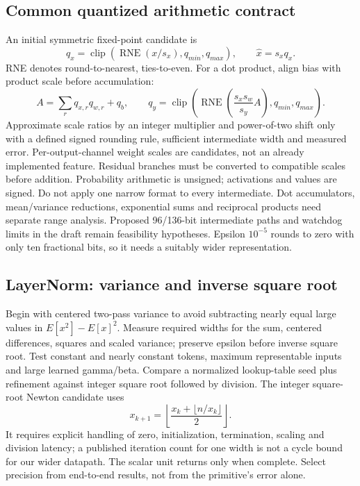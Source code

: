 \documentclass[11pt,a4paper]{article}
\begin{document}
\subsection{Common quantized arithmetic contract}
An initial symmetric fixed-point candidate is
\[
q_x=\operatorname{clip}\left(\operatorname{RNE}(x/s_x),q_{min},q_{max}\right),\qquad \hat x=s_xq_x.
\]
RNE denotes round-to-nearest, ties-to-even. For a dot product, align bias with product scale before accumulation:
\[
A=\sum_r q_{x,r}q_{w,r}+q_b,\qquad
q_y=\operatorname{clip}\left(\operatorname{RNE}\left(\frac{s_xs_w}{s_y}A\right),q_{min},q_{max}\right).
\]
Approximate scale ratios by an integer multiplier and power-of-two shift only with a defined signed rounding rule, sufficient intermediate width and measured error. Per-output-channel weight scales are candidates, not an already implemented feature. Residual branches must be converted to compatible scales before addition. Probability arithmetic is unsigned; activations and values are signed.
Do not apply one narrow format to every intermediate. Dot accumulators, mean/variance reductions, exponential sums and reciprocal products need separate range analysis. Proposed 96/136-bit intermediate paths and watchdog limits in the draft remain feasibility hypotheses. Epsilon $10^{-5}$ rounds to zero with only ten fractional bits, so it needs a suitably wider representation.

\subsection{LayerNorm: variance and inverse square root}
Begin with centered two-pass variance to avoid subtracting nearly equal large values in $E[x^2]-E[x]^2$. Measure required widths for the sum, centered differences, squares and scaled variance; preserve epsilon before inverse square root. Test constant and nearly constant tokens, maximum representable inputs and large learned gamma/beta.
Compare a normalized lookup-table seed plus refinement against integer square root followed by division. The integer square-root Newton candidate uses
\[
x_{k+1}=\left\lfloor\frac{x_k+\lfloor n/x_k\rfloor}{2}\right\rfloor.
\]
It requires explicit handling of zero, initialization, termination, scaling and division latency; a published iteration count for one width is not a cycle bound for our wider datapath. The scalar unit returns only when complete. Select precision from end-to-end results, not from the primitive's error alone.
\end{document}
